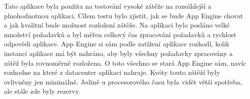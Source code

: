 Tato aplikace byla použita na testování vysoké zátěže na rozsáhlejší a plnohodnotnou aplikaci. Cílem testu bylo zjistit, jak se bude App Engine chovat a jak kvalitní bude možnost rozložení zátěže. Na aplikaci bylo posláno velké množství požadavků a byl měřen celkový čas zpracování požadavků a rychlost odpovědi aplikace.
App Engine si sám podle zatížení aplikace rozhodl, kolik instancí aplikace má být nahráno, aby byly všechny požadavky zpracovány a zátěž byla rovnoměrně rozložena. O toto všechno se stará App Engine sám, navíc rozhodne na které z datacenter aplikaci nahraje. Kvóty touto zátěží byly ovlivněny jen minimálně. Jedině u procesorového času byla vidět větší spotřeba, ale stále zde byly rezervy. 